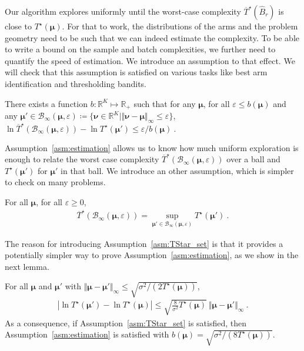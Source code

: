 Our algorithm explores uniformly until the worst-case complexity $\overline{T}^\star(\hat{B}_r)$ is close to $T^\star(\bm\mu)$.
For that to work, the distributions of the arms and the problem geometry need to be such that we can indeed estimate the complexity.
To be able to write a bound on the sample and batch complexities, we further need to quantify the speed of estimation. We introduce an assumption to that effect.
We will check that this assumption is satisfied on various tasks like best arm identification and thresholding bandits.

\begin{assumption}\label{asm:estimation}
There exists a function $b : \mathbb{R}^K \mapsto \mathbb{R}_+$ such that for any $\bm\mu$, for all $\varepsilon \le b(\bm\mu)$ and any $\bm\mu' \in \mathcal B_{\infty}(\bm\mu, \varepsilon) \coloneqq \{\bm\nu \in \mathbb{R}^K \mid \Vert \bm\nu - \bm\mu \Vert_\infty \le \varepsilon\}$, 
$\ln \overline{T}^\star( \mathcal B_{\infty}(\bm\mu, \varepsilon)) - \ln T^\star(\bm\mu')
\le \varepsilon / b(\bm\mu)
\: .$
\end{assumption}

Assumption~\ref{asm:estimation} allows us to know how much uniform exploration is enough to relate the worst case complexity $\overline{T}^\star( \mathcal B_{\infty}(\bm\mu, \varepsilon))$ over a ball and $T^\star(\bm\mu')$ for $\bm\mu'$ in that ball.
We introduce an other assumption, which is simpler to check on many problems.

\begin{assumption}\label{asm:TStar_set}
For all $\bm\mu$, for all $\varepsilon \ge 0$,
\begin{align*}
\overline{T}^\star( \mathcal B_{\infty}(\bm\mu, \varepsilon))
= \sup_{\bm\mu' \in \mathcal B_{\infty}(\bm\mu, \varepsilon)} T^\star(\bm\mu')
\: .
\end{align*}
\end{assumption}

The reason for introducing Assumption~\ref{asm:TStar_set} is that it provides a potentially simpler way to prove Assumption~\ref{asm:estimation}, as we show in the next lemma.

\begin{lemma}\label{lem:asm2_implies_asm1}
For all $\bm\mu$ and $\bm\mu'$ with $\Vert \bm\mu - \bm\mu' \Vert_\infty \le \sqrt{\sigma^2 / (2 T^\star(\bm\mu))}$,
\begin{align*}
\left\vert \ln T^\star(\bm\mu') - \ln T^\star(\bm\mu) \right\vert
\le \sqrt{\frac{8}{\sigma^2}T^\star(\bm\mu)} \ \Vert \bm\mu - \bm\mu' \Vert_\infty
\: .
\end{align*}
As a consequence, if Assumption~\ref{asm:TStar_set} is satisfied, then Assumption~\ref{asm:estimation} is satisfied with $b(\bm\mu) = \sqrt{\sigma^2/(8 T^\star(\bm\mu))}$.
\end{lemma}

